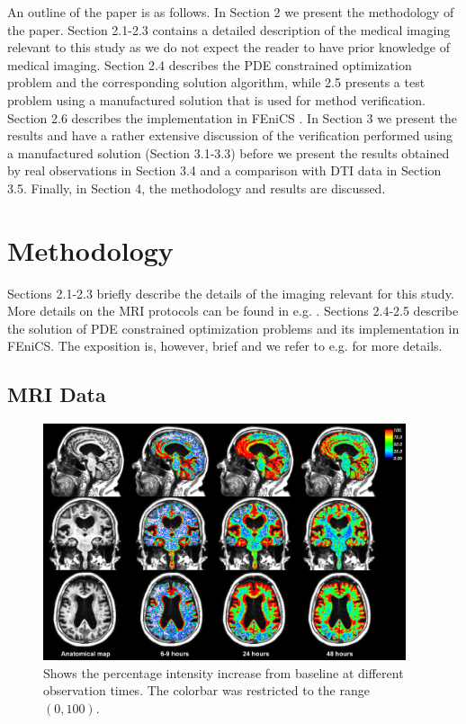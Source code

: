 \documentclass[11pt,a4paper]{article}
\begin{document}
An outline of the paper is as follows. 
In Section 2 we present the methodology of the paper. Section 2.1-2.3 contains a detailed description of the medical imaging 
relevant to this study as we do not expect the reader to have prior knowledge of medical imaging. Section 2.4
describes the PDE constrained optimization problem and the corresponding solution algorithm, while 2.5 presents
a test problem using a manufactured solution that is used for method verification. Section 2.6 describes the implementation 
in FEniCS \cite{LoggMardalEtAl2012a}. In Section 3 we present the results and have a rather extensive discussion of the verification performed
using a manufactured solution (Section 3.1-3.3) before we present the results obtained by real observations in Section 3.4     
and a comparison with DTI data in Section 3.5. Finally, in Section 4, the methodology and results are discussed.  
   
\section{Methodology}

Sections 2.1-2.3 briefly describe the details of the imaging relevant for this study. More details on the MRI protocols can be
found in e.g. \cite{ringstad2018brain}. Sections 2.4-2.5 describe the solution of PDE constrained optimization problems and
its implementation in FEniCS. The exposition is, however, brief and we refer to e.g. \cite{hinze2008optimization} for more details. 







\subsection{MRI Data}
\begin{figure}
\includegraphics[width=0.95\textwidth]{PatID-68-new-100.png} 
\caption{Shows the percentage intensity increase from baseline at different observation times. The colorbar was restricted to the range $(0,100)$.}
\label{fig1} 
\end{figure}
\end{document}
